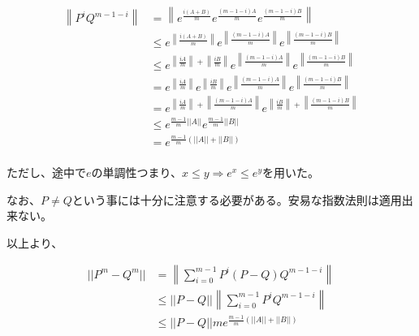 \documentclass[a4paper, 10pt, dvipdfmx]{jlreq}
\begin{document}
\begin{align*}
    \left\lVert P^iQ^{m-1-i}\right\rVert & = \left\lVert e^{\frac{i(A+B)}{m}}e^{\frac{(m-1-i)A}{m}}e^{\frac{(m-1-i)B}{m}} \right\rVert                                                                                \\
                                         & \leq e^{\left\lVert\frac{i(A+B)}{m}\right\rVert}e^{\left\lVert\frac{(m-1-i)A}{m}\right\rVert}e^{\left\lVert\frac{(m-1-i)B}{m}\right\rVert}                                 \\
                                         & \leq e^{\left\lVert\frac{iA}{m}\right\rVert+\left\lVert\frac{iB}{m}\right\rVert}e^{\left\lVert\frac{(m-1-i)A}{m}\right\rVert}e^{\left\lVert\frac{(m-1-i)B}{m}\right\rVert} \\
                                         & = e^{\left\lVert\frac{iA}{m}\right\rVert}e^{\left\lVert\frac{iB}{m}\right\rVert}e^{\left\lVert\frac{(m-1-i)A}{m}\right\rVert}e^{\left\lVert\frac{(m-1-i)B}{m}\right\rVert} \\
                                         & = e^{\left\lVert\frac{iA}{m}\right\rVert+\left\lVert\frac{(m-1-i)A}{m}\right\rVert}e^{\left\lVert\frac{iB}{m}\right\rVert+\left\lVert\frac{(m-1-i)B}{m}\right\rVert}       \\
                                         & \leq e^{\frac{m-1}{m}||A||}e^{\frac{m-1}{m}||B||}                                                                                                                          \\
                                         & = e^{\frac{m-1}{m}(||A||+||B||)}                                                                                                                                           \\
\end{align*}

ただし、途中で$e$の単調性つまり、$x \leq y\Rightarrow e^x \leq e^y$を用いた。

なお、$P \neq Q$という事には十分に注意する必要がある。安易な指数法則は適用出来ない。

以上より、

\begin{align*}
    ||P^m-Q^m|| & =\left\lVert \sum_{i=0}^{m-1}P^i(P-Q)Q^{m-1-i}\right\rVert       \\
                & \leq ||P-Q||\left\lVert \sum_{i=0}^{m-1}P^iQ^{m-1-i}\right\rVert \\
                & \leq ||P-Q||m e^{\frac{m-1}{m}(||A||+||B||)}
\end{align*}
\end{document}
